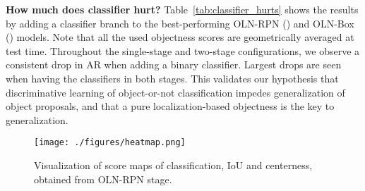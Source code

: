\documentclass[10pt,twocolumn,letterpaper]{article}
\newcommand{\tableref}[1]{Table~\ref{#1}}
\renewcommand{\paragraph}[1]{\vspace{1mm}\noindent\textbf{#1}}
\begin{document}
\begin{table}[]
\centering
{}
\caption{\small{How much does classifier hurt?} Different OLN configurations on {VOC}  {Non-VOC} setting.}
\label{tab:classifier_hurts}
\end{table}




\paragraph{{How much does classifier hurt?}}\quad
\tableref{tab:classifier_hurts} shows the results by adding a classifier branch to the best-performing OLN-RPN () and OLN-Box () models. Note that all the used objectness scores are geometrically averaged at test time. Throughout the single-stage and two-stage configurations, we observe a consistent drop in AR when adding a binary classifier. Largest drops are seen when having the classifiers in both stages. This validates our hypothesis that discriminative learning of object-or-not classification impedes generalization of object proposals, and that a pure localization-based objectness is the key to generalization.

\begin{figure}
\centering
\texttt{[image: ./figures/heatmap.png]}
\vspace{-4mm}
\caption{\small{Visualization of score maps of classification, IoU and centerness, obtained from OLN-RPN stage.}}
\label{fig:heatmap}
\end{figure}
\end{document}
